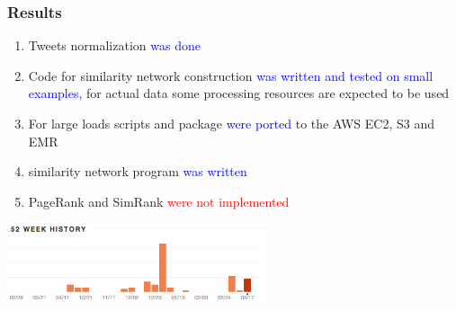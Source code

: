 \documentclass[handout]{beamer}
\begin{document}
\begin{frame}
\frametitle{\bf Results}

\begin{enumerate}
\item Tweets normalization \textcolor{blue}{was done}
\item Code for similarity network construction \textcolor{blue}{was written and tested on small examples}, for actual data some processing resources are expected to be used
\item For large loads scripts and package \textcolor{blue}{were ported} to the AWS EC2, S3 and EMR
\item similarity network program \textcolor{blue}{was written}
\item PageRank and  SimRank \textcolor{red}{were not implemented}
\end{enumerate}

\includegraphics[height=90px]{work-activity.png}

\end{frame}
\end{document}
